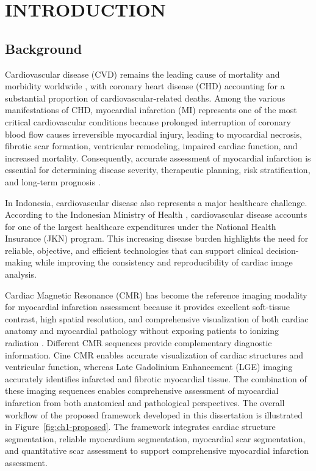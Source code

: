 \chapter{INTRODUCTION}
\label{chap:1}

\section{Background}
\label{sec:background}

Cardiovascular disease (CVD) remains the leading cause of mortality and
morbidity worldwide \citep{WHO2021,Tsao2022}, with coronary heart disease (CHD) accounting for a
substantial proportion of cardiovascular-related deaths. Among the
various manifestations of CHD, myocardial infarction (MI) represents one
of the most critical cardiovascular conditions because prolonged
interruption of coronary blood flow causes irreversible myocardial
injury, leading to myocardial necrosis, fibrotic scar formation,
ventricular remodeling, impaired cardiac function, and increased
mortality. Consequently, accurate assessment of myocardial infarction is
essential for determining disease severity, therapeutic planning, risk
stratification, and long-term prognosis \citep{Thygesen2019}.

In Indonesia, cardiovascular disease also represents a major healthcare
challenge. According to the Indonesian Ministry of Health \citep{Kemenkes2021},
cardiovascular disease accounts for one of the largest healthcare
expenditures under the National Health Insurance (JKN) program. This
increasing disease burden highlights the need for reliable, objective,
and efficient technologies that can support clinical decision-making
while improving the consistency and reproducibility of cardiac image
analysis.

Cardiac Magnetic Resonance (CMR) has become the reference imaging
modality for myocardial infarction assessment because it provides
excellent soft-tissue contrast, high spatial resolution, and
comprehensive visualization of both cardiac anatomy and myocardial
pathology without exposing patients to ionizing radiation \citep{Kim2000,Kramer2020}. Different CMR sequences provide
complementary diagnostic information. Cine CMR enables accurate
visualization of cardiac structures and ventricular function, whereas
Late Gadolinium Enhancement (LGE) imaging accurately identifies
infarcted and fibrotic myocardial tissue. The combination of these
imaging sequences enables comprehensive assessment of myocardial
infarction from both anatomical and pathological perspectives. The
overall workflow of the proposed framework developed in this
dissertation is illustrated in Figure~\ref{fig:ch1-proposed}. The framework integrates cardiac structure segmentation, reliable myocardium
segmentation, myocardial scar segmentation, and quantitative scar
assessment to support comprehensive myocardial infarction assessment.


